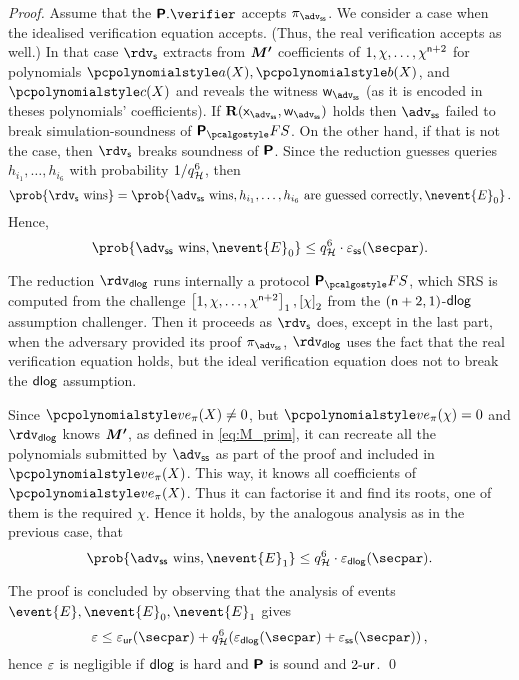 \documentclass[runningheads,11pt]{llncs}
\def\vec#1{\mathchoice{\mbox{\boldmath$\displaystyle#1$}}
{\mbox{\boldmath$\textstyle#1$}} {\mbox{\boldmath$\scriptstyle#1$}}
{\mbox{\boldmath$\scriptscriptstyle#1$}}}
\theoremstyle{definition} \newtheorem{definition}[theorem]{Definition}
\begin{document}
\begin{proof}
  Assume that the $\plonkprot.\verifier$ accepts $\zkproof_\advss$. We consider
  a case when the idealised verification equation accepts. (Thus, the real
  verification accepts as well.) In that case $\rdvs$ extracts from $\vec{M'}$
  coefficients of $1, \chi, \ldots, \chi^{\mathsf{n} + 2}$ for
  polynomials $\p{a}(X), \p{b}(X)$, and $\p{c}(X)$ and reveals the witness
  $\wit_\advss$ (as it is encoded in theses polynomials' coefficients). If
  $\REL(\inp_\advss, \wit_\advss)$ holds then $\advss$ failed to break
  simulation-soundness of $\plonkprotfs$. On the other hand, if that is not the
  case, then $\rdvs$ breaks soundness of $\bm{\mathsf{P}}$.
  Since the reduction guesses queries $h_{i_1}, \ldots, h_{i_6}$ with
  probability $1/q_{\mathcal{H}}^6$, then
  \[
    \prob{\rdvs \text{ wins}} = \prob{\advss \text{ wins}, h_{i_1}, \ldots,
      h_{i_6} \text{ are guessed correctly}, \nevent{E}_0}\,.
  \]
  Hence,
  \[
    \prob{\advss \text{ wins}, \nevent{E}_0} \leq q_\ro^6 \cdot \epsss(\secpar).
  \]

   The reduction $\rdvdlog$ runs internally a
  protocol $\plonkprotfs$, which SRS is computed from the challenge
  $\left[1, \chi, \ldots, \chi^{\mathsf{n} + 2}\right]_{1}, \left[\chi\right]_{2}$ from the
  $(\mathsf{n} + 2, 1)$-$\mathsf{dlog}$ assumption challenger. Then it proceeds
  as $\rdvs$ does, except in the last part, when the adversary provided its
  proof $\zkproof_\advss$, $\rdvdlog$ uses the fact that the real verification
  equation holds, but the ideal verification equation does not to break the
  $\mathsf{dlog}$ assumption.

  Since $\vereq_\zkproof(X) \neq 0$, but $\vereq_\zkproof(\chi) = 0$ and $\rdvdlog$ knows
  $\vec{M'}$, as defined in \cref{eq:M_prim}, it can recreate all the
  polynomials submitted by $\advss$ as part of the proof and included in
  $\vereq_\zkproof(X)$. This way, it knows all coefficients of $\vereq_\zkproof(X)$. Thus it can
  factorise it and find its roots, one of them is the required $\chi$. Hence it
  holds, by the analogous analysis as in the previous case, that
  \[
    \prob{\advss \text{ wins}, \nevent{E}_1} \leq q_\ro^6 \cdot
    \eps_{\dlog}(\secpar).
  \]

  The proof is concluded by observing that the analysis of events
  $\event{E}, \nevent{E}_0, \nevent{E}_1$ gives
  \[
    \eps \leq \epsur(\secpar) + q_\ro^6 (\eps_{\dlog}(\secpar) +
    \epsss(\secpar))\,,
  \]
  hence $\varepsilon$ is negligible if $\mathsf{dlog}$ is hard and $\bm{\mathsf{P}}$ is sound and
  ${2\text{-}\mathsf{ur}}$.  \qed
\end{proof}
\end{document}
